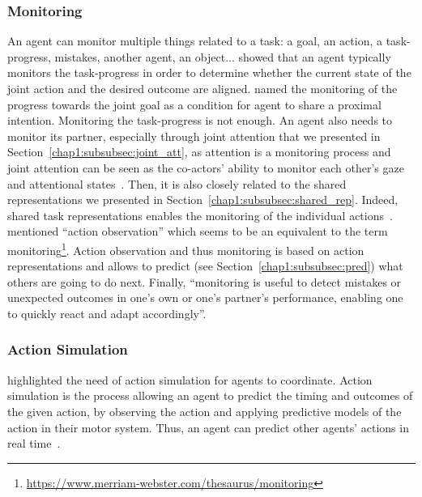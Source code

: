 \documentclass[a4paper,11pt,twoside]{StyleThese}
\begin{document}
\subsubsection{Monitoring}\label{chap1:subsubsec:monitoring}
An agent can monitor multiple things related to a task: a goal, an action, a task-progress, mistakes, another agent, an object... \cite{vesper_2010_minimal} showed that an agent typically monitors the task-progress in order to determine whether the current state of the joint action and the desired outcome are aligned. \cite{pacherie_2012_agency} named the monitoring of the progress towards the joint goal as a condition for agent to share a proximal intention. Monitoring the task-progress is not enough. An agent also needs to monitor its partner, especially through joint attention that we presented in Section~\ref{chap1:subsubsec:joint_att}, as attention is a monitoring process and joint attention can be seen as the co-actors’ ability to monitor each other’s gaze and attentional states~\citep{emery_2000_eyes}. Then, it is also closely related to the shared representations we presented in Section~\ref{chap1:subsubsec:shared_rep}. Indeed, shared task representations enables the monitoring of the individual actions~\citep{knoblich_2011_joint}. \cite{sebanz_2006_joint} mentioned ``action observation'' which seems to be an equivalent to the term monitoring\footnote{\url{https://www.merriam-webster.com/thesaurus/monitoring}}. Action observation and thus monitoring is based on action representations and allows to predict (see Section~\ref{chap1:subsubsec:pred}) what others are going to do next. Finally, ``monitoring is useful to detect mistakes or unexpected outcomes in one's own or one's partner's performance, enabling one to quickly react and adapt accordingly''.

\subsubsection{Action Simulation}
\cite{sebanz_2009_prediction,knoblich_2011_joint} highlighted the need of action simulation for agents to coordinate. Action simulation is the process allowing an agent to predict the timing and outcomes of the given action, by observing the action and applying predictive models of the action in their motor system. Thus, an agent can predict other agents' actions in real time~\citep{wolpert_2003_unifying}.
\end{document}
